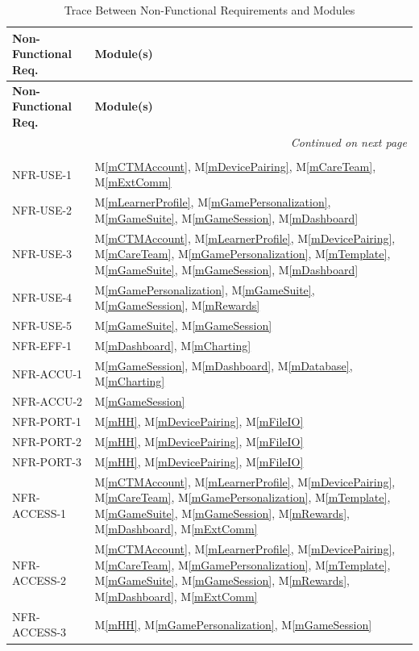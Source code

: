 \documentclass[12pt, titlepage]{article}
\newcommand{\mref}[1]{M\ref{#1}}
\begin{document}
\begin{longtable}{p{} p{}}
\toprule
\textbf{Non-Functional Req.} & \textbf{Module(s)}\\
\midrule
\endfirsthead
\toprule
\textbf{Non-Functional Req.} & \textbf{Module(s)}\\
\midrule
\endhead
\midrule
\multicolumn{2}{r}{\textit{Continued on next page}}\\
\endfoot
\bottomrule
\caption{Trace Between Non-Functional Requirements and Modules}
\label{TblNFR}\\
\endlastfoot
NFR-USE-1 & \mref{mCTMAccount}, \mref{mDevicePairing}, \mref{mCareTeam}, \mref{mExtComm}\\
NFR-USE-2 & \mref{mLearnerProfile}, \mref{mGamePersonalization}, \mref{mGameSuite}, \mref{mGameSession}, \mref{mDashboard}\\
NFR-USE-3 & \mref{mCTMAccount}, \mref{mLearnerProfile}, \mref{mDevicePairing}, \mref{mCareTeam}, \mref{mGamePersonalization}, \mref{mTemplate}, \mref{mGameSuite}, \mref{mGameSession}, \mref{mDashboard}\\
NFR-USE-4 & \mref{mGamePersonalization}, \mref{mGameSuite}, \mref{mGameSession}, \mref{mRewards}\\
NFR-USE-5 & \mref{mGameSuite}, \mref{mGameSession}\\
NFR-EFF-1 & \mref{mDashboard}, \mref{mCharting}\\
NFR-ACCU-1 & \mref{mGameSession}, \mref{mDashboard}, \mref{mDatabase}, \mref{mCharting}\\
NFR-ACCU-2 & \mref{mGameSession}\\
NFR-PORT-1 & \mref{mHH}, \mref{mDevicePairing}, \mref{mFileIO}\\
NFR-PORT-2 & \mref{mHH}, \mref{mDevicePairing}, \mref{mFileIO}\\
NFR-PORT-3 & \mref{mHH}, \mref{mDevicePairing}, \mref{mFileIO}\\
NFR-ACCESS-1 & \mref{mCTMAccount}, \mref{mLearnerProfile}, \mref{mDevicePairing}, \mref{mCareTeam}, \mref{mGamePersonalization}, \mref{mTemplate}, \mref{mGameSuite}, \mref{mGameSession}, \mref{mRewards}, \mref{mDashboard}, \mref{mExtComm}\\
NFR-ACCESS-2 & \mref{mCTMAccount}, \mref{mLearnerProfile}, \mref{mDevicePairing}, \mref{mCareTeam}, \mref{mGamePersonalization}, \mref{mTemplate}, \mref{mGameSuite}, \mref{mGameSession}, \mref{mRewards}, \mref{mDashboard}, \mref{mExtComm}\\
NFR-ACCESS-3 & \mref{mHH}, \mref{mGamePersonalization}, \mref{mGameSession}\\

\end{longtable}
\end{document}
